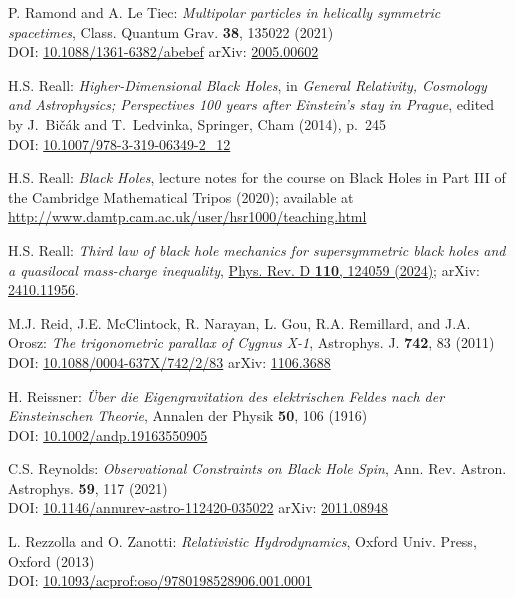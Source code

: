 \begin{thebibliography}{123}
P. Ramond and A. Le Tiec:
{\em Multipolar particles in helically symmetric spacetimes},
Class. Quantum Grav. {\bf 38}, 135022 (2021)\\
DOI: \href{https://doi.org/10.1088/1361-6382/abebef}{10.1088/1361-6382/abebef}\hfill
arXiv: \href{https://arxiv.org/abs/2005.00602}{2005.00602}

H.S. Reall:
{\em Higher-Dimensional Black Holes},
in {\em  General Relativity, Cosmology and Astrophysics; Perspectives 100 years after Einstein's stay in Prague}, edited by J.~Bičák and T.~Ledvinka,
Springer, Cham (2014), p.~245\\
DOI: \href{https://doi.org/10.1007/978-3-319-06349-2_12}{10.1007/978-3-319-06349-2\_12}

H.S. Reall: {\em Black Holes}, lecture notes for the course on Black Holes in
Part III of the Cambridge Mathematical Tripos (2020); available at\\
\url{http://www.damtp.cam.ac.uk/user/hsr1000/teaching.html}

H.S. Reall:
{\em Third law of black hole mechanics for supersymmetric black holes and a quasilocal mass-charge inequality},
\href{https://doi.org/10.1103/PhysRevD.110.124059}{Phys. Rev. D {\bf 110}, 124059 (2024)};
arXiv: \href{https://arxiv.org/abs/2410.11956}{2410.11956}.

M.J. Reid, J.E. McClintock, R. Narayan, L. Gou, R.A. Remillard, and J.A. Orosz:
{\em The trigonometric parallax of Cygnus X-1},
Astrophys. J. {\bf 742}, 83 (2011)\\
DOI: \href{https://doi.org/10.1088/0004-637X/742/2/83}{10.1088/0004-637X/742/2/83}\hfill
arXiv: \href{https://arxiv.org/abs/1106.3688}{1106.3688}

H. Reissner:
{\em Über die Eigengravitation des elektrischen Feldes nach der Einsteinschen Theorie},
Annalen der Physik {\bf 50}, 106 (1916)\\
DOI: \href{https://doi.org/10.1002/andp.19163550905}{10.1002/andp.19163550905}

C.S. Reynolds:
{\em Observational Constraints on Black Hole Spin},
Ann. Rev. Astron. Astrophys. {\bf 59}, 117 (2021)\\
DOI:  \href{https://doi.org/10.1146/annurev-astro-112420-035022}{10.1146/annurev-astro-112420-035022}\hfill
arXiv: \href{https://arxiv.org/abs/2011.08948}{2011.08948}

L. Rezzolla and O. Zanotti:
{\em Relativistic Hydrodynamics},
Oxford Univ. Press, Oxford (2013)\\
DOI: \href{https://doi.org/10.1093/acprof:oso/9780198528906.001.0001}{10.1093/acprof:oso/9780198528906.001.0001}


\end{thebibliography}
